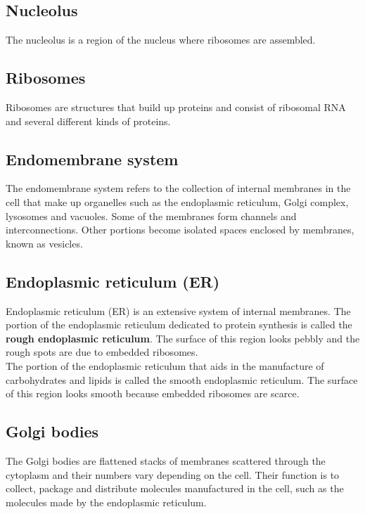 \documentclass[11pt]{article}
\begin{document}
\subsection{Nucleolus}
\label{sec:org1be3cbc}
The nucleolus is a region of the nucleus where ribosomes are assembled.

\subsection{Ribosomes}
\label{sec:org8de0115}
Ribosomes are structures that build up proteins and consist of ribosomal RNA and several different kinds of proteins.

\newpage

\subsection{Endomembrane system}
\label{sec:org93e617e}
The endomembrane system refers to the collection of internal membranes in the cell that make up organelles such as the endoplasmic reticulum, Golgi complex, lysosomes and vacuoles. Some of the membranes form channels and interconnections. Other portions become isolated spaces enclosed by membranes, known as vesicles.

\subsection{Endoplasmic reticulum (ER)}
\label{sec:org6665d04}
Endoplasmic reticulum (ER) is an extensive system of internal membranes. The portion of the endoplasmic reticulum dedicated to protein synthesis is called the \textbf{rough endoplasmic reticulum}. The surface of this region looks pebbly and the rough spots are due to embedded ribosomes.
\\[0pt]

The portion of the endoplasmic reticulum that aids in the manufacture of carbohydrates and lipids is called the smooth endoplasmic reticulum. The surface of this region looks smooth because embedded ribosomes are scarce.

\subsection{Golgi bodies}
\label{sec:org25b386c}
The Golgi bodies are flattened stacks of membranes scattered through the cytoplasm and their numbers vary depending on the cell. Their function is to collect, package and distribute molecules manufactured in the cell, such as the molecules made by the endoplasmic reticulum.
\end{document}
